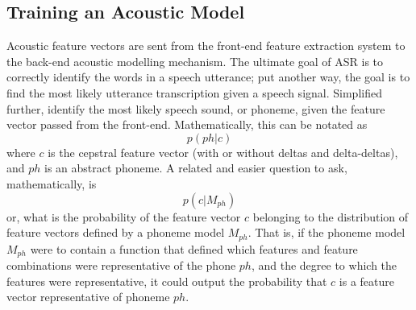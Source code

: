 \DIFdelbegin \subsubsection{}
\addtocounter{subsubsection}{-1}%
\DIFdelend \DIFaddbegin \subsection{Training an Acoustic Model}\label{sec:acoust-mod}
\DIFaddend 

Acoustic feature vectors are sent from the front-end feature extraction system to the back-end acoustic modelling mechanism.  The ultimate goal of ASR is to correctly identify the words in a speech utterance; put another way, the goal is to find the most likely utterance transcription given a speech signal.  Simplified further, identify the most likely speech sound, or phoneme, given the feature vector passed from the front-end.  Mathematically, this can be notated as \begin{equation} p(ph|c) \end{equation} where $c$ is the cepstral feature vector (with or without deltas and delta-deltas), and $ph$ is an abstract phoneme.  A related and easier question to ask, mathematically, is \begin{equation} p(c|M_{ph}) \end{equation} or, what is the probability of the feature vector $c$ belonging to the distribution of feature vectors defined by a phoneme model $M_{ph}$.  That is, if the phoneme model $M_{ph}$ were to contain a function that defined which features and feature combinations were representative of the phone $ph$, and the degree to which the features were representative, it could output the probability that $c$ is a feature vector representative of phoneme $ph$.

